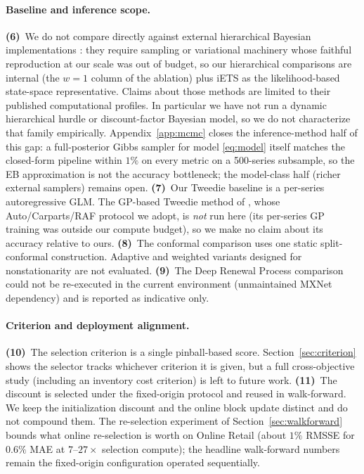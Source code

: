 \documentclass[twocolumn,10pt]{article}
\begin{document}
\paragraph{Baseline and inference scope.}
\textbf{(6)}~We do not compare directly against external
hierarchical Bayesian implementations
\citep{chapados2014,seeger2016,pitkin2024}: they require sampling or
variational machinery whose faithful reproduction at our scale was out
of budget, so our hierarchical comparisons are internal (the $w{=}1$
column of the ablation) plus iETS as the likelihood-based state-space
representative. Claims about those methods are limited to their
published computational profiles. In particular we have not run a
dynamic hierarchical hurdle or discount-factor Bayesian model, so we do
not characterize that family empirically. Appendix~\ref{app:mcmc}
closes the inference-method half of this gap: a full-posterior Gibbs
sampler for model \eqref{eq:model} itself matches the closed-form
pipeline within $1\%$ on every metric on a 500-series subsample, so the
EB approximation is not the accuracy bottleneck; the model-class half
(richer external samplers) remains open. \textbf{(7)}~Our Tweedie
baseline is a per-series autoregressive GLM. The GP-based Tweedie method
of \citet{damato2025}, whose Auto/Carparts/RAF protocol we adopt, is
\emph{not} run here (its per-series GP training was outside our compute
budget), so we make no claim about its accuracy relative to ours.
\textbf{(8)}~The conformal comparison uses one static split-conformal
construction. Adaptive and weighted variants designed for nonstationarity
are not evaluated. \textbf{(9)}~The Deep Renewal Process comparison could
not be re-executed in the current environment (unmaintained MXNet
dependency) and is reported as indicative only.

\paragraph{Criterion and deployment alignment.}
\textbf{(10)}~The selection criterion is a single pinball-based score.
Section~\ref{sec:criterion} shows the selector tracks whichever criterion
it is given, but a full cross-objective study (including an inventory
cost criterion) is left to future work.
\textbf{(11)}~The discount is selected under the fixed-origin protocol
and reused in walk-forward. We keep the initialization discount and the
online block update distinct and do not compound them. The re-selection
experiment of Section~\ref{sec:walkforward} bounds what online
re-selection is worth on Online Retail (about $1\%$ RMSSE for $0.6\%$
MAE at $7$--$27\times$ selection compute); the headline walk-forward
numbers remain the fixed-origin configuration operated sequentially.
\end{document}
